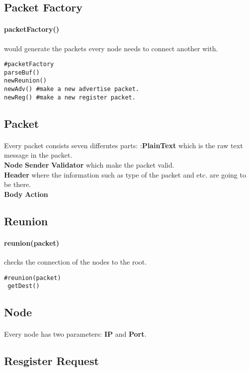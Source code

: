 \documentclass{article}
\begin{document}
\subsection{Packet Factory}
\paragraph{packetFactory()} would generate the packets every node needs to connect another with.
\begin{lstlisting}
#packetFactory
parseBuf()
newReunion()
newAdv() #make a new advertise packet.
newReg() #make a new register packet.
\end{lstlisting}
\subsection{Packet}
\paragraph{}Every packet consists seven differntes parts: :\textbf{PlainText} which is the raw text message in the packet.\\
 \textbf{Node} \textbf{Sender} \textbf{Validator} which make the packet valid.\\ \textbf{Header} where the information such as type of the packet and etc. are going to be there.\\ \textbf{Body}  \textbf{Action}
\subsection{Reunion}
\paragraph{reunion(packet)} checks the connection of the nodes to the root.
\begin{lstlisting}
#reunion(packet)
 getDest()
\end{lstlisting}
\subsection{Node}
\paragraph{}Every node has two parameters: \textbf{IP} and \textbf{Port}.
\subsection{Resgister Request}
\end{document}
